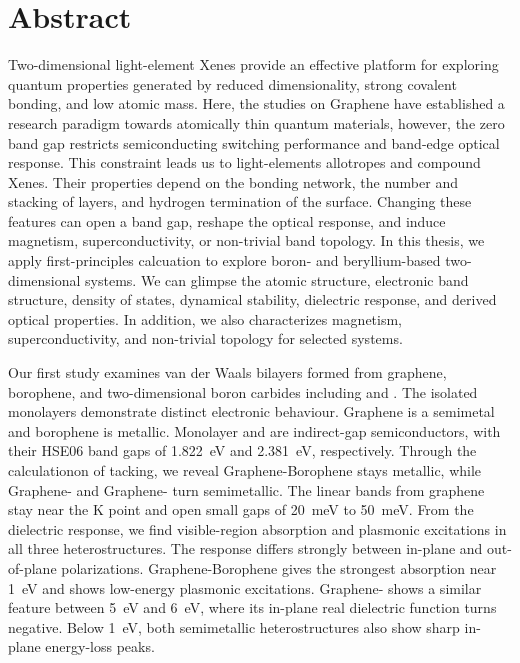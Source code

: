 \chapter*{Abstract}

Two-dimensional light-element Xenes provide an effective platform for exploring quantum properties generated by reduced dimensionality, strong covalent bonding, and low atomic mass.
Here, the studies on Graphene have established a research paradigm towards atomically thin quantum materials,
however, the zero band gap restricts semiconducting switching performance and band-edge optical response.
This constraint leads us to light-elements allotropes and compound Xenes.
Their properties depend on the bonding network, the number and stacking of layers, and hydrogen termination of the surface.
Changing these features can open a band gap, reshape the optical response, and induce magnetism, superconductivity, or non-trivial band topology.
In this thesis, we apply first-principles calcuation to explore boron- and beryllium-based two-dimensional systems.
We can glimpse the atomic structure, electronic band structure, density of states, dynamical stability, dielectric response, and derived optical properties.
In addition, we also characterizes magnetism, superconductivity,
and non-trivial topology for selected systems.

Our first study examines van der Waals bilayers formed from graphene, borophene, and two-dimensional boron carbides including  and .
The isolated monolayers demonstrate distinct electronic behaviour.
Graphene is a semimetal and borophene is metallic.
Monolayer  and  are indirect-gap semiconductors,
with their HSE06 band gaps of \qty{1.822}{\electronvolt} and \qty{2.381}{\electronvolt}, respectively.
Through the calculationon of tacking,
we reveal Graphene-Borophene stays metallic,
while Graphene- and Graphene- turn semimetallic.
The linear bands from graphene stay near the $\mathrm{K}$ point and open small gaps of \qty{20}{\milli\electronvolt} to \qty{50}{\milli\electronvolt}.
From the dielectric response, we find visible-region absorption and plasmonic excitations in all three heterostructures.
The response differs strongly between in-plane and out-of-plane polarizations.
Graphene-Borophene gives the strongest absorption near \qty{1}{\electronvolt} and shows low-energy plasmonic excitations.
Graphene- shows a similar feature between \qty{5}{\electronvolt} and \qty{6}{\electronvolt}, where its in-plane real dielectric function turns negative.
Below \qty{1}{\electronvolt}, both semimetallic heterostructures also show sharp in-plane energy-loss peaks.

